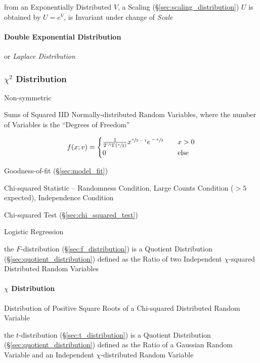 from an Exponentially Distributed $V$, a Scaling
(\S\ref{sec:scaling_distribution}) $U$ is obtained by $U = e^V$, is Invariant
under change of \emph{Scale}



\paragraph{Double Exponential Distribution}\label{sec:double_exponential}\hfill

or \emph{Laplace Distribution}



\subsubsection{$\chi^2$ Distribution}\label{sec:chi_squared}

Non-symmetric

Sums of Squared IID Normally-distributed Random Variables, where the number of
Variables is the ``Degrees of Freedom''

\[
  f(x; v) =
  \begin{cases}
    \frac{1}{2^{\sfrac{v}{2}}\Gamma(\sfrac{v}{2})}
      x^{\sfrac{v}{2-1}} e^{\sfrac{-x}{2}}
          & \quad x > 0 \\
    0     & \quad\text{else} \\
  \end{cases}
\]

Goodness-of-fit (\S\ref{sec:model_fit})

Chi-squared Statistic -- Randomness Condition, Large Counts Condition ($>5$
expected), Independence Condition

\fist Chi-squared Test (\S\ref{sec:chi_squared_test})

Logistic Regression

the $F$-distribution (\S\ref{sec:f_distribution}) is a Quotient Distribution
(\S\ref{sec:quotient_distribution}) defined as the Ratio of two Independent
$\chi$-squared Distributed Random Variables



\paragraph{$\chi$ Distribution}\label{sec:chi_distribution}\hfill

Distribution of Positive Square Roots of a Chi-squared Distributed Random
Variable

the $t$-distribution (\S\ref{sec:t_distribution}) is a Quotient Distribution
(\S\ref{sec:quotient_distribution}) defined as the Ratio of a Gaussian Random
Variable and an Independent $\chi$-distributed Random Variable




